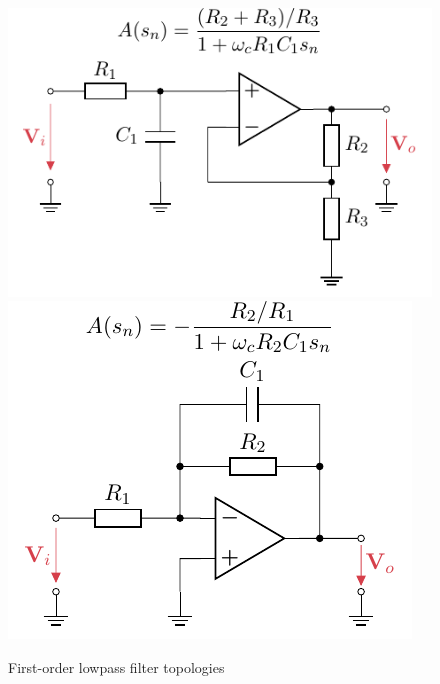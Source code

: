 \begin{figure}[!htb]
  \centering
    {\includegraphics[scale=0.95]{figures/electronics/lowpass/lp_active_1ord_imp_conv/lp_active_1ord_imp_conv}}
    \hspace{4em}
    {\includegraphics[scale=0.95]{figures/electronics/lowpass/lp_active_1ord_inv_amp/lp_active_1ord_inv_amp}}
  \\[0.5em]
  \caption[First-Order Lowpass Filter Topologies]{First-order lowpass filter topologies%
    \label{fig:lp_active_1ord_top}}
\end{figure}

